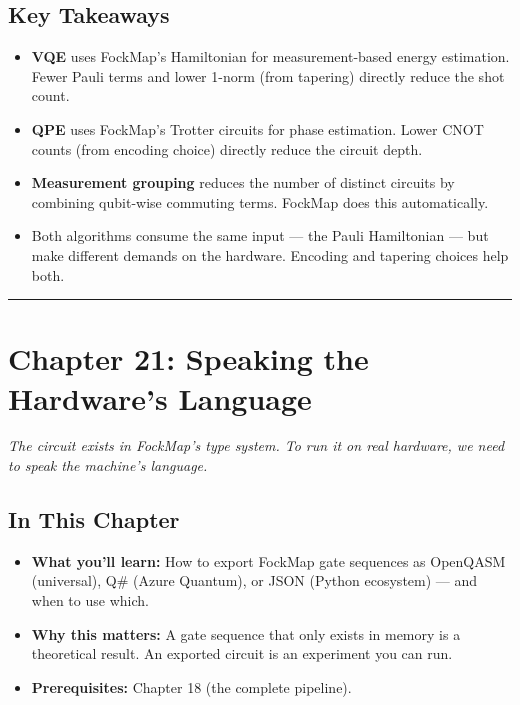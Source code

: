 \documentclass[
  11pt,
  oneside]{book}
\providecommand{\tightlist}{%
  \setlength{\itemsep}{0pt}\setlength{\parskip}{0pt}}
\begin{document}
\section{Key Takeaways}\label{key-takeaways-19}

\begin{itemize}
\tightlist
\item
  \textbf{VQE} uses FockMap's Hamiltonian for measurement-based energy
  estimation. Fewer Pauli terms and lower 1-norm (from tapering)
  directly reduce the shot count.
\item
  \textbf{QPE} uses FockMap's Trotter circuits for phase estimation.
  Lower CNOT counts (from encoding choice) directly reduce the circuit
  depth.
\item
  \textbf{Measurement grouping} reduces the number of distinct circuits
  by combining qubit-wise commuting terms. FockMap does this
  automatically.
\item
  Both algorithms consume the same input --- the Pauli Hamiltonian ---
  but make different demands on the hardware. Encoding and tapering
  choices help both.
\end{itemize}

\begin{center}\rule{0.5\linewidth}{0.5pt}\end{center}

\chapter{Chapter 21: Speaking the Hardware's
Language}\label{chapter-21-speaking-the-hardwares-language}

\emph{The circuit exists in FockMap's type system. To run it on real
hardware, we need to speak the machine's language.}

\section{In This Chapter}\label{in-this-chapter-20}

\begin{itemize}
\tightlist
\item
  \textbf{What you'll learn:} How to export FockMap gate sequences as
  OpenQASM (universal), Q\# (Azure Quantum), or JSON (Python ecosystem)
  --- and when to use which.
\item
  \textbf{Why this matters:} A gate sequence that only exists in memory
  is a theoretical result. An exported circuit is an experiment you can
  run.
\item
  \textbf{Prerequisites:} Chapter 18 (the complete pipeline).
\end{itemize}
\end{document}
